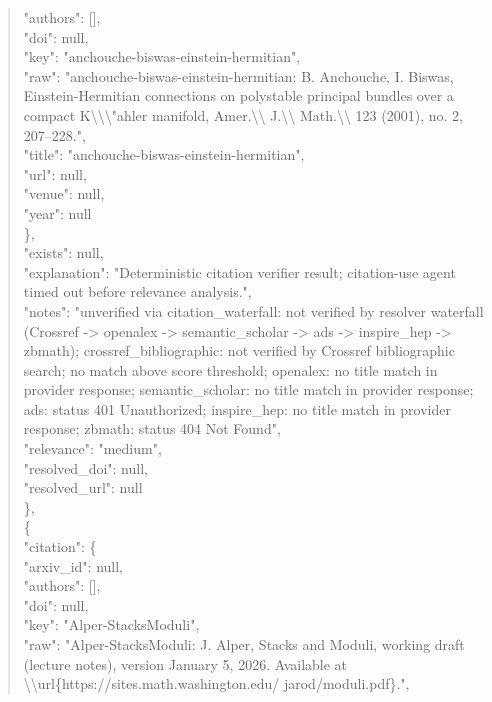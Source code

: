 \documentclass[11pt]{article}
\begin{document}
\begin{quote}
        "authors": [],\\
        "doi": null,\\
        "key": "anchouche-biswas-einstein-hermitian",\\
        "raw": "anchouche-biswas-einstein-hermitian: B. Anchouche, I. Biswas, Einstein-Hermitian connections on polystable principal bundles over a compact K\textbackslash{}\textbackslash{}\textbackslash{}"ahler manifold, Amer.\textbackslash{}\textbackslash{} J.\textbackslash{}\textbackslash{} Math.\textbackslash{}\textbackslash{} 123 (2001), no. 2, 207--228.",\\
        "title": "anchouche-biswas-einstein-hermitian",\\
        "url": null,\\
        "venue": null,\\
        "year": null\\
      \},\\
      "exists": null,\\
      "explanation": "Deterministic citation verifier result; citation-use agent timed out before relevance analysis.",\\
      "notes": "unverified via citation\_waterfall: not verified by resolver waterfall (Crossref -> openalex -> semantic\_scholar -> ads -> inspire\_hep -> zbmath); crossref\_bibliographic: not verified by Crossref bibliographic search; no match above score threshold; openalex: no title match in provider response; semantic\_scholar: no title match in provider response; ads: status 401 Unauthorized; inspire\_hep: no title match in provider response; zbmath: status 404 Not Found",\\
      "relevance": "medium",\\
      "resolved\_doi": null,\\
      "resolved\_url": null\\
    \},\\
    \{\\
      "citation": \{\\
        "arxiv\_id": null,\\
        "authors": [],\\
        "doi": null,\\
        "key": "Alper-StacksModuli",\\
        "raw": "Alper-StacksModuli: J. Alper, Stacks and Moduli, working draft (lecture notes), version January 5, 2026. Available at \textbackslash{}\textbackslash{}url\{https://sites.math.washington.edu/ jarod/moduli.pdf\}.",\\

\end{quote}
\end{document}
